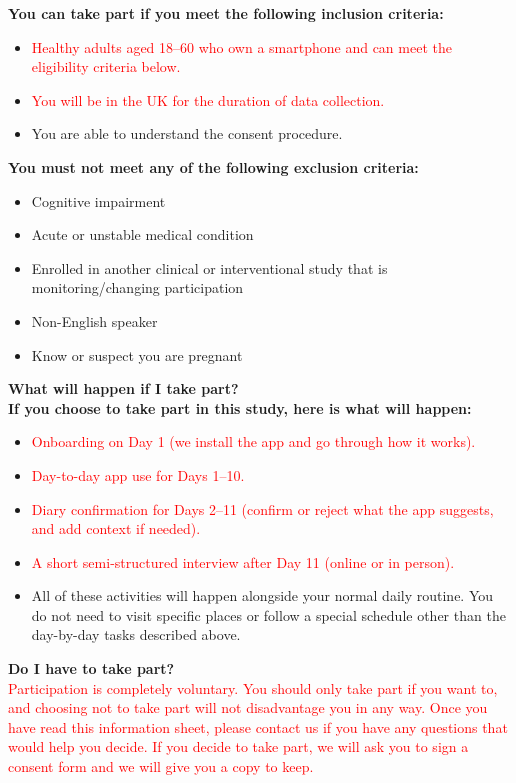\documentclass[12pt]{article}
\newcommand{\chg}[1]{\textcolor{red}{#1}}
\begin{document}
\vspace{0.75em}
\noindent\textbf{You can take part if you meet the following inclusion criteria:}
\begin{itemize}[leftmargin=1.2em]
  \item \chg{Healthy adults aged 18--60 who own a smartphone and can meet the eligibility criteria below.}
  \item \chg{You will be in the UK for the duration of data collection.}
  \item You are able to understand the consent procedure.
\end{itemize}

\vspace{0.75em}
\noindent\textbf{You must not meet any of the following exclusion criteria:}
\begin{itemize}[leftmargin=1.2em]
  \item Cognitive impairment
  \item Acute or unstable medical condition
  \item Enrolled in another clinical or interventional study that is monitoring/changing participation
  \item Non-English speaker
  \item Know or suspect you are pregnant
\end{itemize}

\vspace{1.25em}
\noindent\textbf{What will happen if I take part?}\\
\textbf{If you choose to take part in this study, here is what will happen:}

\begin{itemize}[leftmargin=1.2em]
  \item \chg{Onboarding on Day 1 (we install the app and go through how it works).}
  \item \chg{Day-to-day app use for Days 1--10.}
  \item \chg{Diary confirmation for Days 2--11 (confirm or reject what the app suggests, and add context if needed).}
  \item \chg{A short semi-structured interview after Day 11 (online or in person).}
  \item All of these activities will happen alongside your normal daily routine. You do not need to visit specific places or follow a special schedule other than the day-by-day tasks described above.
\end{itemize}

\vspace{1em}
\noindent\textbf{Do I have to take part?}\\
\chg{Participation is completely voluntary. You should only take part if you want to, and choosing not to take part will not disadvantage you in any way.}
\chg{Once you have read this information sheet, please contact us if you have any questions that would help you decide. If you decide to take part, we will ask you to sign a consent form and we will give you a copy to keep.}
\end{document}
